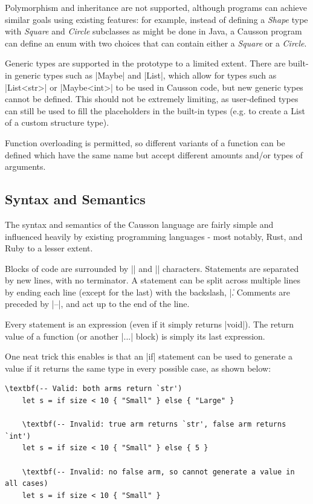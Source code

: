 \documentclass[11pt]{report}
\begin{document}
Polymorphism and inheritance are not supported, although programs can achieve similar goals using existing features: for example, instead of defining a \emph{Shape} type with \emph{Square} and \emph{Circle} subclasses as might be done in Java, a Causson program can define an enum with two choices that can contain either a \emph{Square} or a \emph{Circle}.

Generic types are supported in the prototype to a limited extent. There are built-in generic types such as |Maybe| and |List|, which allow for types such as |List<str>| or |Maybe<int>| to be used in Causson code, but new generic types cannot be defined. This should not be extremely limiting, as user-defined types can still be used to fill the placeholders in the built-in types (e.g. to create a List of a custom structure type).

Function overloading is permitted, so different variants of a function can be defined which have the same name but accept different amounts and/or types of arguments.

\subsection{Syntax and Semantics}

The syntax and semantics of the Causson language are fairly simple and influenced heavily by existing programming languages - most notably, Rust, and Ruby to a lesser extent.

Blocks of code are surrounded by |{| and |}| characters. Statements are separated by new lines, with no terminator. A statement can be split across multiple lines by ending each line (except for the last) with the backslash, |\|. Comments are preceded by |--|, and act up to the end of the line.

Every statement is an expression (even if it simply returns |void|). The return value of a function (or another |{...}| block) is simply its last expression.

One neat trick this enables is that an |if| statement can be used to generate a value if it returns the same type in every possible case, as shown below:

\begin{Verbatim}[commandchars=\\()]
    \textbf(-- Valid: both arms return `str')
    let s = if size < 10 { "Small" } else { "Large" }
    
    \textbf(-- Invalid: true arm returns `str', false arm returns `int')
    let s = if size < 10 { "Small" } else { 5 }
    
    \textbf(-- Invalid: no false arm, so cannot generate a value in all cases)
    let s = if size < 10 { "Small" }
\end{Verbatim}
\end{document}

